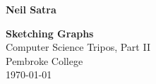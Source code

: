 

\begin{titlepage}

\hfill{\LARGE \bf Neil Satra}

\vspace*{\fill}

\begin{center}
\begin{doublespacing}


\Huge {\bf Sketching Graphs} \\
Computer Science Tripos, Part II \\
Pembroke College \\
\today

\end{doublespacing}
\end{center}

\vspace*{\fill}
\end{titlepage}